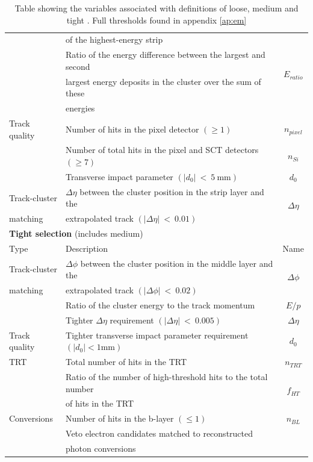 \begin {table}[h!]
\begin{center}
\begin{tabular}{llc}
							& of the highest-energy strip 				&           \\
							\rule{0pt}{3ex}
							& Ratio of the energy difference between the largest and second  		& \multirow{2}{*}{$E_{ratio}$}			\\
							& largest  energy deposits in the cluster over the sum of these 					&						\\
							& energies & \\
\rule{0pt}{4ex}Track quality	& Number of hits in the pixel detector $(\geq1)$							& $n_{pixel}$			\\
							& Number of total hits in the pixel and SCT detectors $(\geq7)$					& $n_{Si}$				\\
							& Transverse impact parameter $(|d_{0}|~<~5~\text{mm})$							& $d_{0}$				\\
\rule{0pt}{4ex}Track-cluster		& $\Delta\eta$ between the cluster position in the strip layer and the  	& \multirow{2}{*}{$\Delta\eta$} 	\\
		matching			& extrapolated track $(|\Delta\eta|~<~0.01)$													& 						\\
		\hline				
		\hline
		\multicolumn{3}{l}{{\bf Tight selection} (includes medium)}																	\\
		Type 				& Description 																	& Name 					\\
		\hline
\rule{0pt}{3ex}Track-cluster		& $\Delta\phi$ between the cluster position in the middle layer and the  & \multirow{2}{*}{$\Delta\phi$}	\\
		matching			& extrapolated track $(|\Delta\phi|~<~0.02)$													& 						\\
							& Ratio of the cluster energy to the track momentum								& $E/p$					\\
							& Tighter $\Delta\eta$ requirement $(|\Delta\eta|~<~0.005)$						& $\Delta\eta$ 			\\
\rule{0pt}{4ex}Track quality		& Tighter transverse impact parameter requirement $(|d_{0}|<1\text{mm})$		& $d_{0}$				\\
		TRT 				& Total number of hits in the TRT 												& $n_{TRT}$				\\
							& Ratio of the number of high-threshold hits to the total number  				& \multirow{2}{*}{$f_{HT}$}				\\
							& of hits in the TRT 																		& 						\\
\rule{0pt}{4ex}Conversions 	& Number of hits in the b-layer $(\leq1)$ 										& $n_{BL}$				\\
							& Veto electron candidates matched to reconstructed  & 						\\
							& photon conversions 		 						 & 						\\
		\hline
  		\end{tabular}
  	\caption{Table showing the variables associated with definitions of loose, medium and tight \cite{Aad:2011mk}. Full thresholds found in appendix \ref{ap:em}}
  	\label{tab:Rec_lmt}
  	\end{center}
	\end {table}












